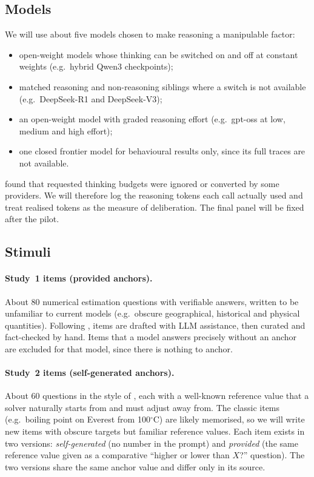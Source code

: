 \documentclass[11pt,a4paper]{article}
\begin{document}
\subsection{Models}

We will use about five models chosen to make reasoning a manipulable factor:
\begin{itemize}
  \item open-weight models whose thinking can be switched on and off at constant weights (e.g.\ hybrid Qwen3 checkpoints);
  \item matched reasoning and non-reasoning siblings where a switch is not available (e.g.\ DeepSeek-R1 and DeepSeek-V3);
  \item an open-weight model with graded reasoning effort (e.g.\ gpt-oss at low, medium and high effort);
  \item one closed frontier model for behavioural results only, since its full traces are not available.
\end{itemize}
\citet{kraishan2026long} found that requested thinking budgets were ignored or converted by some providers. We will therefore log the reasoning tokens each call actually used and treat realised tokens as the measure of deliberation. The final panel will be fixed after the pilot.

\subsection{Stimuli}

\paragraph{Study~1 items (provided anchors).} About 80 numerical estimation questions with verifiable answers, written to be unfamiliar to current models (e.g.\ obscure geographical, historical and physical quantities). Following \citet{huang2025understanding}, items are drafted with LLM assistance, then curated and fact-checked by hand. Items that a model answers precisely without an anchor are excluded for that model, since there is nothing to anchor.

\paragraph{Study~2 items (self-generated anchors).} About 60 questions in the style of \citet{epley2001putting}, each with a well-known reference value that a solver naturally starts from and must adjust away from. The classic items (e.g.\ boiling point on Everest from 100$^\circ$C) are likely memorised, so we will write new items with obscure targets but familiar reference values. Each item exists in two versions: \emph{self-generated} (no number in the prompt) and \emph{provided} (the same reference value given as a comparative ``higher or lower than $X$?'' question). The two versions share the same anchor value and differ only in its source.
\end{document}
